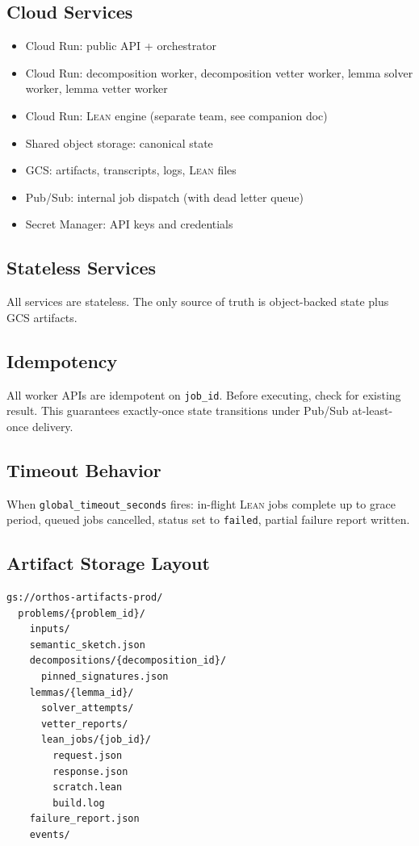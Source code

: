 \documentclass[11pt,a4paper]{article}
\newcommand{\Lean}{\textsc{Lean}}
\begin{document}
\subsection{Cloud Services}
\begin{itemize}[leftmargin=2em]
  \item Cloud Run: public API + orchestrator
  \item Cloud Run: decomposition worker, decomposition vetter worker, lemma solver worker, lemma vetter worker
  \item Cloud Run: \Lean{} engine (separate team, see companion doc)
  \item Shared object storage: canonical state
  \item GCS: artifacts, transcripts, logs, \Lean{} files
  \item Pub/Sub: internal job dispatch (with dead letter queue)
  \item Secret Manager: API keys and credentials
\end{itemize}

\subsection{Stateless Services}
All services are stateless. The only source of truth is object-backed state plus GCS artifacts.

\subsection{Idempotency}
All worker APIs are idempotent on \texttt{job\_id}. Before executing, check for existing result. This guarantees exactly-once state transitions under Pub/Sub at-least-once delivery.

\subsection{Timeout Behavior}
When \texttt{global\_timeout\_seconds} fires: in-flight \Lean{} jobs complete up to grace period, queued jobs cancelled, status set to \texttt{failed}, partial failure report written.

\subsection{Artifact Storage Layout}
\begin{lstlisting}
gs://orthos-artifacts-prod/
  problems/{problem_id}/
    inputs/
    semantic_sketch.json
    decompositions/{decomposition_id}/
      pinned_signatures.json
    lemmas/{lemma_id}/
      solver_attempts/
      vetter_reports/
      lean_jobs/{job_id}/
        request.json
        response.json
        scratch.lean
        build.log
    failure_report.json
    events/
\end{lstlisting}
\end{document}
